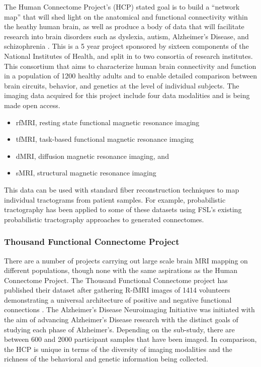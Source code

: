 The Human Connectome Project’s (HCP) stated goal is to build a “network map” 
that will shed light on the anatomical and functional connectivity within the 
heathy human brain, as well as produce a body of data that will facilitate 
research into brain disorders such as dyslexia, autism, Alzheimer’s Disease, and 
schizophrenia \cite {vanessen} \cite {sporns}.  This is a 5 year project 
sponsored by sixteen components of the National Institutes of Health, and split  
in to two consortia of research institutes.  This consortium that aims to 
characterize human brain connectivity and function in a population of 1200 
healthy adults and to enable detailed comparison between brain circuits, 
behavior, and genetics at the level of individual subjects.  The imaging data 
acquired for this project include four data modalities and is being made open access.
\begin{itemize}
\item rfMRI, resting state functional magnetic resonance imaging
\item tfMRI, task-based functional magnetic resonance imaging
\item dMRI, diffusion magnetic resonance imaging, and 
\item sMRI, structural magnetic resonance imaging
\end{itemize}
This data can be used with standard fiber reconstruction techniques to map 
individual tractograms from patient samples.  For example, probabilistic 
tractography has been applied to some of these datasets using FSL’s existing 
probabilistic tractography approaches to generated connectomes\cite{sot2013}.

\subsubsection {Thousand Functional Connectome Project}

There are a number of projects carrying out large scale brain MRI mapping on 
different populations, though none with the same aspirations as the Human 
Connectome Project.  The Thousand Functional Connectome project has published 
their dataset after gathering R-fMRI images of 1414 volunteers demonstrating a 
universal architecture of positive and negative functional connections
\cite{biswal2013}.  The Alzheimer’s Disease Neuroimaging Initiative was initiated with the aim of advancing Alzheimer’s Disease research with the distinct goals of studying each phase of Alzheimer’s.  Depending on the sub-study, there are between 600 and 2000 participant samples that have been imaged. In comparison, the HCP is unique in terms of the diversity of imaging modalities and the richness of the behavioral and genetic information being collected.

